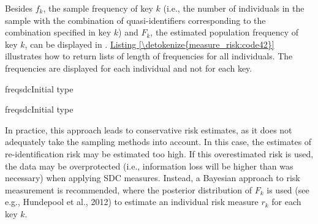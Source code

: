 \documentclass[letterpaper,10pt,english]{sphinxmanual}
\begin{document}
Besides \(f_{k}\), the sample frequency of key
\(k\) (i.e., the number of individuals in the sample with
the combination of quasi-identifiers corresponding to the combination
specified in key \(k\)) and \(F_{k}\), the estimated population
frequency of key \(k\), can be displayed in . \hyperref[\detokenize{measure_risk:code42}]{Listing \ref{\detokenize{measure_risk:code42}}}
illustrates how to return lists of length  of frequencies for all
individuals. The frequencies are displayed for each individual and not
for each key.

\def\sphinxLiteralBlockLabel{\label{\detokenize{measure_risk:code42}}}
%
\begin{sphinxVerbatim}[commandchars=\\\{\},numbers=left,firstnumber=1,stepnumber=1]
 freqsdcInitial type  
          

 freqsdcInitial type  
          
\end{sphinxVerbatim}

In practice, this approach leads to conservative risk estimates, as it
does not adequately take the sampling methods into account. In this
case, the estimates of re-identification risk may be estimated too high.
If this overestimated risk is used, the data may be overprotected (i.e.,
information loss will be higher than was necessary) when applying SDC
measures. Instead, a Bayesian approach to risk measurement is
recommended, where the posterior distribution of \(F_{k}\) is used
(see e.g., Hundepool et al., 2012) to estimate an individual risk
measure \(r_{k}\) for each key \(k\).
\end{document}
